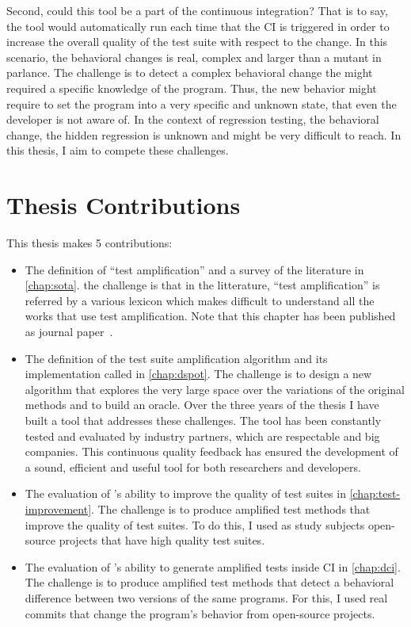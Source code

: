Second, could this tool  be a part of the continuous integration?
That is to say, the tool would automatically run each time that the CI is triggered in order to increase the overall quality of the test suite with respect to the change.
In this scenario, the behavioral changes is real, complex and larger than a mutant in \ms parlance.
The challenge is to detect a complex behavioral change the might required a specific knowledge of the program.
Thus, the new behavior might require to set the program into a very specific and unknown state, that even the developer is not aware of.
In the context of regression testing, the behavioral change, \ie the hidden regression is unknown and might be very difficult to reach.
In this thesis, I aim to compete these challenges.

\section{Thesis Contributions}
\label{sec:intro:contributions}

This thesis makes 5 contributions:
\begin{itemize}
    \item The definition of ``test amplification'' and a survey of the literature in \autoref{chap:sota}.
    the challenge is that in the litterature, ``test amplification'' is referred by a various lexicon which makes difficult to understand all the works that use test amplification.
    Note that this chapter has been published as journal paper~\cite{DANGLOT2019110398}.
    \item The definition of the test suite amplification algorithm and its implementation called \dspot in \autoref{chap:dspot}.
    The challenge is to design a new algorithm that explores the very large space over the variations of the original methods and to build an oracle.
    Over the three years of the thesis I have built a tool that addresses these challenges.
    The tool has been constantly tested and evaluated by industry partners, which are respectable and big companies.
    This continuous quality feedback has ensured the development of a sound, efficient and useful tool for both researchers and developers.
    \item The evaluation of \dspot's ability to improve the quality of test suites in \autoref{chap:test-improvement}.
    The challenge is to produce amplified test methods that improve the quality of test suites.
    To do this, I used as study subjects open-source projects that have high quality test suites.
    \item The evaluation of \dspot's ability to generate amplified tests inside CI in \autoref{chap:dci}.
    The challenge is to produce amplified test methods that detect a behavioral difference between two versions of the same programs.
    For this, I used real commits that change the program's behavior from open-source projects.
\end{itemize}

